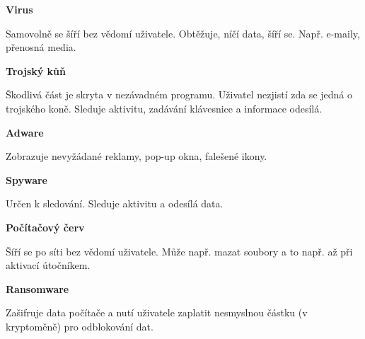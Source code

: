 \documentclass[aspectratio=1610]{beamer}
\begin{document}
\begin{frame}
    \begin{multicols}{2}
        \centering

        \begin{cardTiny}
            \begin{flushleft}
                \textbf{Virus}

                Samovolně se šíří bez vědomí uživatele. Obtěžuje, níčí data, šíří se. Např. e-maily, přenosná media.
            \end{flushleft}
        \end{cardTiny}

        \begin{cardTiny}
            \begin{flushleft}
                \textbf{Trojský kůň}

                Škodlivá část je skryta v nezávadném programu. Uživatel nezjistí zda se jedná o trojského koně. Sleduje aktivitu, zadávání klávesnice a informace odesílá.
            \end{flushleft}
        \end{cardTiny}

        \begin{cardTiny}
            \begin{flushleft}
                \textbf{Adware}

                Zobrazuje nevyžádané reklamy, pop-up okna, falešené ikony.
            \end{flushleft}
        \end{cardTiny}

        \begin{cardTiny}
            \begin{flushleft}
                \textbf{Spyware}

                Určen k sledování. Sleduje aktivitu a odesílá data.
            \end{flushleft}
        \end{cardTiny}

        \begin{cardTiny}
            \begin{flushleft}
                \textbf{Počítačový červ}

                Šíří se po síti bez vědomí uživatele. Může např. mazat soubory a to např. až při aktivací útočníkem.
            \end{flushleft}
        \end{cardTiny}

        \begin{cardTiny}
            \begin{flushleft}
                \textbf{Ransomware}

                Zašifruje data počítače a nutí uživatele zaplatit nesmyslnou částku (v kryptoměně) pro odblokování dat.
            \end{flushleft}
        \end{cardTiny}
    \end{multicols}
\end{frame}
\end{document}
